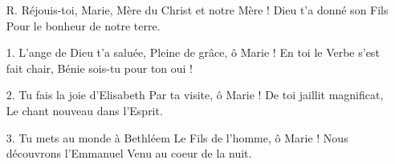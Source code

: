 \begin{itemize}
\item[R.]
Réjouis-toi, Marie,
Mère du Christ et notre Mère !
Dieu t’a donné son Fils
Pour le bonheur de notre terre.
\item[1.]
L’ange de Dieu t’a saluée,
Pleine de grâce, ô Marie !
En toi le Verbe s’est fait chair,
Bénie sois-tu pour ton oui !
\item[2.]
Tu fais la joie d’Elisabeth
Par ta visite, ô Marie !
De toi jaillit magnificat,
Le chant nouveau dans l’Esprit.
\item[3.]
Tu mets au monde à Bethléem
Le Fils de l’homme, ô Marie !
Nous découvrons l’Emmanuel
Venu au coeur de la nuit.
\end{itemize}
